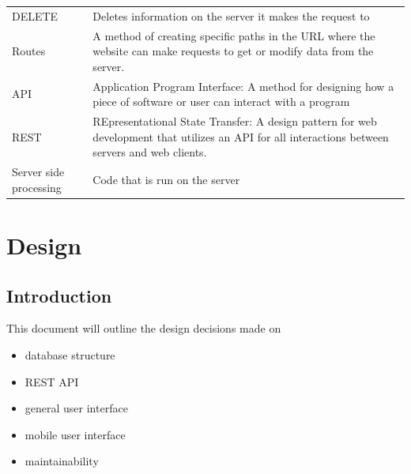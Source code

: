 \documentclass[draftclsnofoot,onecolumn,letterpaper,10pt]{IEEEtran}
\begin{document}
\begin{longtable}{p{4cm}p{12cm}}
    DELETE & Deletes information on the server it makes the request to \\
    Routes & A method of creating specific paths in the URL where the website can make requests to get or modify data from the server. \\
    API & Application Program Interface: A method for designing how a piece of software or user can interact with a program \\
    REST & REpresentational State Transfer: A design pattern for web development that utilizes an API for all interactions between servers and web clients. \\
    Server side processing & Code that is run on the server \\
\end{longtable}

\section{Design}
	\subsection{Introduction}
	This document will outline the design decisions made on
	\begin{itemize}
		\item database structure
		\item REST API
		\item general user interface
		\item mobile user interface
		\item maintainability
	\end{itemize}
\end{document}
